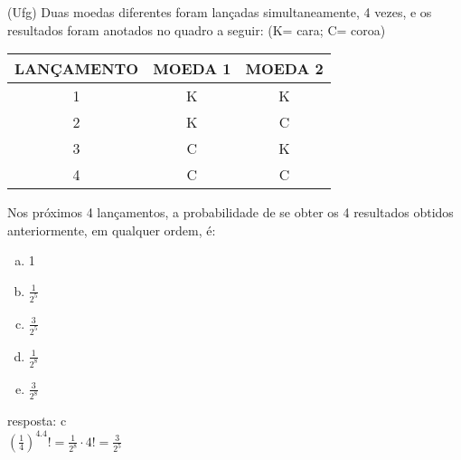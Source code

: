 \begin{ex}
(Ufg) Duas moedas diferentes foram lançadas simultaneamente, 4 vezes, e os resultados foram anotados no quadro a seguir:
(K= cara; C= coroa)
\begin{center}
\begin{tabular}{|c|c|c|}  \hline
LANÇAMENTO  &  MOEDA 1 & MOEDA 2\\  \hline
1  &  K  &  K   \\  \hline
2  &  K  &  C   \\  \hline
3  &  C  &  K   \\  \hline
4  &  C  &  C  \\ \hline
\end{tabular}
\end{center}
Nos próximos 4 lançamentos, a probabilidade de se obter os 4 resultados obtidos anteriormente, em qualquer ordem, é:
   \begin{enumerate}[(a)]
   \item 1
   \item $\frac{1}{2^5}$
   \item $\frac{3}{2^5}$
   \item $\frac{1}{2^8}$
   \item $\frac{3}{2^8}$
   \end{enumerate}
   \begin{sol}
    resposta: c \\
    $(\frac{1}{4})^4.4!= \frac{1}{2^8}\cdot4!=\frac{3}{2^5}$
   \end{sol}
\end{ex}
